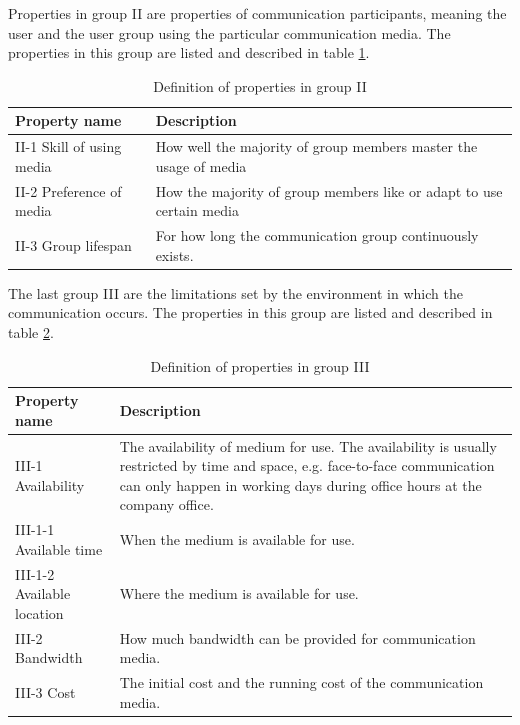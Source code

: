 \documentclass[english,12pt,a4paper,pdftex]{article}
\begin{document}
Properties in group II are properties of communication participants, meaning the user and the user group using the particular communication media. The properties in this group are listed and described in table \ref{table:mft_group2}.

\begin{table}[!h]
\renewcommand{\arraystretch}{1.3}
\caption{Definition of properties in group II}
\label{table:mft_group2}
\centering
\begin{tabular}{|p{4cm}|p{10cm}|}
\hline
\textbf{Property name} & \textbf{Description}\\
\hline
II-1 Skill of using media & How well the majority of group members master the usage of media  \\
\hline
II-2 Preference of media & How the majority of group members like or adapt to use certain media \\
\hline
II-3 Group lifespan & For how long the communication group continuously exists. \\
\hline
\end{tabular}
\end{table}

The last group III are the limitations set by the environment in which the communication occurs. The properties in this group are listed and described in table \ref{table:mft_group3}.

\begin{table}[!h]
\renewcommand{\arraystretch}{1.3}
\caption{Definition of properties in group III}
\label{table:mft_group3}
\centering
\begin{tabular}{|p{4cm}|p{10cm}|}
\hline
\textbf{Property name} & \textbf{Description}\\
\hline
III-1 Availability & The availability of medium for use. The availability is usually restricted by time and space, e.g. face-to-face communication can only happen in working days during office hours at the company office. \\
\hline
III-1-1 Available time & When the medium is available for use. \\
\hline
III-1-2 Available location & Where the medium is available for use. \\
\hline
III-2 Bandwidth & How much bandwidth can be provided for communication media. \\
\hline
III-3 Cost & The initial cost and the running cost of the communication media. \\
\hline
\end{tabular}
\end{table}
\end{document}
